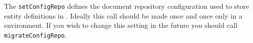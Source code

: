 The \verb+setConfigRepo+ defines the document repository configuration used to store entity definitions
in \Rapture. Ideally this call should be made once and once only in a \Rapture environment. If you wish to
change this setting in the future you should call \verb+migrateConfigRepo+.
